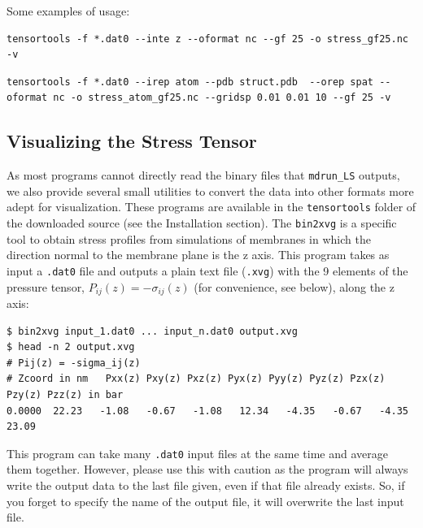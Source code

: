 \documentclass[10pt,letterpaper,notitlepage]{article}
\begin{document}
Some examples of usage:
\begin{lstlisting}[caption={Read the IKN stress from *.dat0 files, integrate out the z direction, smooth the data with a Gaussian filter of 25 (units of the grid size), and write the result in the file stress\_gf25.nc}]
tensortools -f *.dat0 --inte z --oformat nc --gf 25 -o stress_gf25.nc -v
\end{lstlisting}

\begin{lstlisting}[caption={Read the stress per atom from *.dat0 files, load the PDB structure from struct.pdb, translate the data to a grid with spacing 0.01, 0.01, 10, apply a Gaussian filter of 25 and store the result in stress\_atom\_gf25.nc}]
tensortools -f *.dat0 --irep atom --pdb struct.pdb  --orep spat --oformat nc -o stress_atom_gf25.nc --gridsp 0.01 0.01 10 --gf 25 -v
\end{lstlisting}


\subsection{Visualizing the Stress Tensor}
As most programs cannot directly read the binary files that \texttt{mdrun\_LS} outputs, we also provide several small utilities to convert the data into other formats more adept for visualization. These programs are available in the \texttt{tensortools} folder of the downloaded source (see the Installation section). The \texttt{bin2xvg} is a specific tool to obtain stress profiles from simulations of membranes in which the direction normal to the membrane plane is the z axis. This program takes as input a \texttt{.dat0} file and outputs a plain text file (\texttt{.xvg}) with the 9 elements of the pressure tensor, $P_{ij}(z)=-\sigma_{ij}(z)$ (for convenience, see below), along the z axis:
\begin{lstlisting}[caption=\texttt{bin2xvg} usage]
$ bin2xvg input_1.dat0 ... input_n.dat0 output.xvg
$ head -n 2 output.xvg
# Pij(z) = -sigma_ij(z)
# Zcoord in nm 	 Pxx(z) Pxy(z) Pxz(z) Pyx(z) Pyy(z) Pyz(z) Pzx(z) Pzy(z) Pzz(z) in bar
0.0000	22.23	-1.08	-0.67	-1.08	12.34	-4.35	-0.67	-4.35	23.09
\end{lstlisting}
This program can take many \texttt{.dat0} input files at the same time and average them together. However, please use this with caution as the program will always write the output data to the last file given, even if that file already exists. So, if you forget to specify the name of the output file, it will overwrite the last input file.
\end{document}
